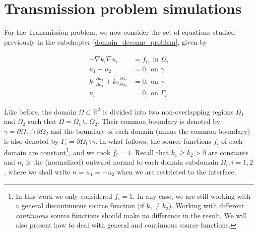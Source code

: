 

\section{Transmission problem simulations}\label{numerical_transmission_simulations}

For the Transmission problem, we now consider the set of equations studied previously in the subchapter \ref{domain_decomp_problem}, given by

\begin{align}\label{transmission_num}
    \begin{split}
    - \nabla k_i \nabla u_i &= f_i, \; \text{in }\Omega_i\\
    u_1 - u_2 &= 0, \; \text{on }\gamma\\
    k_1 \frac{\partial u_1}{\partial n_1} + k_2 \frac{\partial u_2}{\partial n_2} &= 0, \; \text{on }\gamma\\
    u_i &= 0, \; \text{on }\Gamma_i.
    \end{split}
\end{align}

Like before, the domain \(\Omega \subset \mathbb{R}^2\) is divided into two non-overlapping regions \(\Omega_1\) and \(\Omega_2\) such that \(\overline{\Omega} = \overline{\Omega_1} \cup \overline{\Omega_2}\). Their common boundary is denoted by \(\gamma = \partial\Omega_1 \cap \partial\Omega_2\) and the boundary of each domain (minus the common boundary) is also denoted by \(\Gamma_i = \partial\Omega_1\setminus{\gamma}\). In what follows, the source functions \(f_i\) of each domain are constant\footnote{In this work we only considered \(f_i=1\). In any case, we are still working with a general discontinuous source function (if \(k_1 \neq k_2\)). Working with different \textit{continuous} source functions should make no difference in the result. We will also present how to deal with general and continuous source functions.}, and we took \(f_i = 1\). Recall that \(k_1 \geq k_2 > 0\) are constants and \(n_i\) is the (normalized) outward normal to each domain subdomain \(\Omega_i, i=1, 2\), where we shall write \(n=n_1=-n_2\) when we are restricted to the interface.

